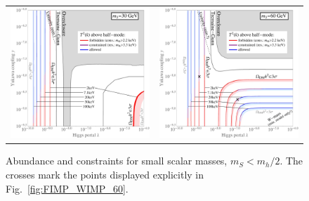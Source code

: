\begin{figure}[t]
\begin{tabular}{lr}\hspace{-1cm}
 \includegraphics[width=8.3cm]{figures/HalfMode_30_until4.jpeg} & \includegraphics[width=8.3cm]{figures/HalfMode_60_until4.jpeg}
\end{tabular}
\caption{\label{fig:verysmall_masses}Abundance and constraints for small scalar masses, $m_S < m_h/2$. The crosses mark the points displayed explicitly in Fig.~\ref{fig:FIMP_WIMP_60}.}
\end{figure}

